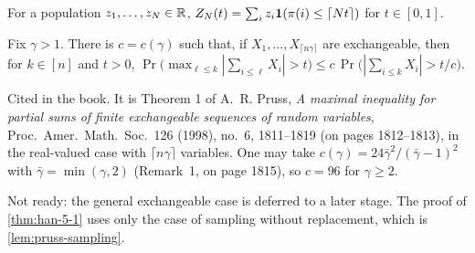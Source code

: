 \begin{definition}
  \label{def:rosen}
  For a population $z_1,\dots,z_N\in\mathbb{R}$, $Z_N(t)=\sum_iz_i\mathbf{1}(\pi(i)\le\lceil Nt\rceil)$ for $t\in[0,1]$.
\end{definition}

\begin{lemma}
  \label{lem:han-5-1}
  \notready
  Fix $\gamma>1$. There is $c=c(\gamma)$ such that, if $X_1,\dots,X_{\lceil n\gamma\rceil}$ are exchangeable, then for $k\in[n]$ and $t>0$,
  $\Pr\bigl(\max_{\ell\le k}|\sum_{i\le\ell}X_i|>t\bigr)\le c\,\Pr\bigl(|\sum_{i\le k}X_i|>t/c\bigr)$.
\end{lemma}
\begin{remark}
  Cited in the book. It is Theorem 1 of A.~R. Pruss, \emph{A maximal inequality for partial sums of finite exchangeable sequences of random variables}, Proc.\ Amer.\ Math.\ Soc.\ 126 (1998), no.~6, 1811--1819 (on pages 1812--1813), in the real-valued case with $\lceil n\gamma\rceil$ variables. One may take $c(\gamma)=24\bar\gamma^2/(\bar\gamma-1)^2$ with $\bar\gamma=\min(\gamma,2)$ (Remark~1, on page 1815), so $c=96$ for $\gamma\ge2$.

  Not ready: the general exchangeable case is deferred to a later stage. The proof of \cref{thm:han-5-1} uses only the case of sampling without replacement, which is \cref{lem:pruss-sampling}.
\end{remark}

